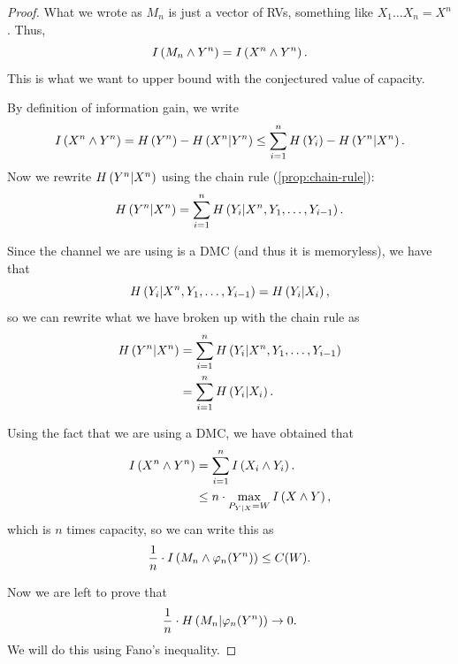 \begin{proof}
	What we wrote as $M_n$ is just a vector of \acp{RV}, \ie something like $X_1 \dots X_n = X^n$.
	Thus,
	\begin{equation*}
		I \left( {M_n \land Y^n} \right) =
		I \left( {X^n \land Y^n} \right).
	\end{equation*}
	This is what we want to upper bound with the conjectured value of capacity.

	By definition of information gain, we write
	\begin{equation*}
		I \left( {X^n \land Y^n} \right) =
		H\left({Y^n}\right) - H\left({X^n | Y^n}\right) \le
		\sum_{i = 1}^n H\left({Y_i}\right) - H\left({Y^n | X^n}\right).
	\end{equation*}
	Now we rewrite $H\left({Y^n | X^n}\right)$ using the chain rule (\cref{prop:chain-rule}):
	\begin{equation*}
		H\left({Y^n | X^n}\right) =
		\sum_{i = 1}^n H\left({Y_i | X^n, Y_1, \dots, Y_{i-1}}\right).
	\end{equation*}

	Since the channel we are using is a \ac{DMC} (and thus it is memoryless), we have that
	\begin{equation*}
		H\left({Y_i | X^n, Y_1, \dots, Y_{i-1}}\right) =
		H\left({Y_i | X_i}\right),
	\end{equation*}
	so we can rewrite what we have broken up with the chain rule as
	\begin{align*}
		H\left({Y^n | X^n}\right)
		& =
		\sum_{i = 1}^n H\left({Y_i | X^n, Y_1, \dots, Y_{i-1}}\right)
		\\
		& =
		\sum_{i = 1}^{n} H\left({Y_i | X_i}\right).
	\end{align*}

	Using the fact that we are using a \ac{DMC}, we have obtained that
	\begin{align*}
		I \left( {X^n \land Y^n} \right)
		& =
		\sum_{i = 1}^{n} I \left( {X_i \land Y_i} \right).
		\\
		& \le
		n \cdot \max_{P_{Y|X} = W} I \left( {X \land Y} \right),
	\end{align*}
	which is $n$ times capacity, so we can write this as
	\begin{equation*}
		\frac{1}{n} \cdot I \left( {M_n \land \varphi_n(Y^n)} \right) \le C(W).
	\end{equation*}

	Now we are left to prove that
	\begin{equation*}
		\frac{1}{n} \cdot H\left({M_n | \varphi_n(Y^n)}\right) \to 0.
	\end{equation*}
	We will do this using Fano's inequality.


\end{proof}
